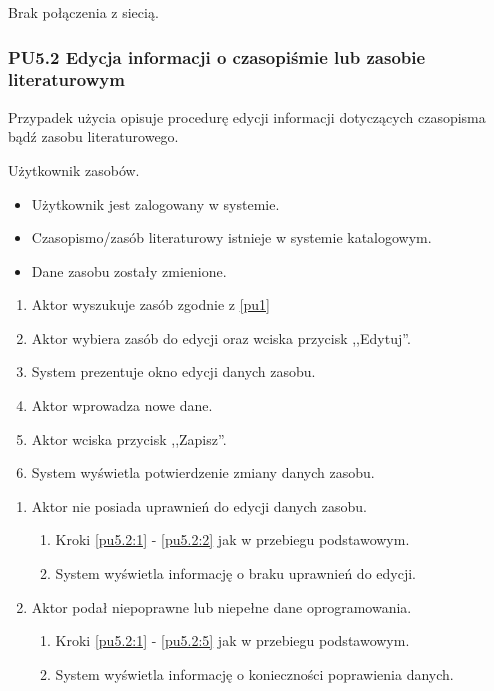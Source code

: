 Brak połączenia z siecią.

\subsubsection{PU5.2 Edycja informacji o czasopiśmie lub zasobie literaturowym}

Przypadek użycia opisuje procedurę edycji informacji dotyczących czasopisma bądź zasobu literaturowego.

Użytkownik zasobów.

\begin{itemize}
\item Użytkownik jest zalogowany w systemie.
\item Czasopismo/zasób literaturowy istnieje w systemie katalogowym.
\end{itemize}

\begin{itemize}
\item Dane zasobu zostały zmienione.
\end{itemize}

\begin{enumerate}
\item \label{pu5.2:1} Aktor wyszukuje zasób zgodnie z \ref{pu1}
\item \label{pu5.2:2} Aktor wybiera zasób do edycji oraz wciska przycisk ,,Edytuj''.
\item System prezentuje okno edycji danych zasobu.
\item Aktor wprowadza nowe dane.
\item \label{pu5.2:5} Aktor wciska przycisk ,,Zapisz''.
\item System wyświetla potwierdzenie zmiany danych zasobu.
\end{enumerate}

\begin{enumerate}
\item Aktor nie posiada uprawnień do edycji danych zasobu.
	\begin{enumerate}[label*=\arabic*.]
		\item Kroki \ref{pu5.2:1} - \ref{pu5.2:2} jak w przebiegu podstawowym.
		\item System wyświetla informację o braku uprawnień do edycji.
	\end{enumerate}
\item Aktor podał niepoprawne lub niepełne dane oprogramowania.
	\begin{enumerate}[label*=\arabic*.]
		\item Kroki \ref{pu5.2:1} - \ref{pu5.2:5} jak w przebiegu podstawowym.
		\item System wyświetla informację o konieczności poprawienia danych.
	\end{enumerate}
\end{enumerate}

